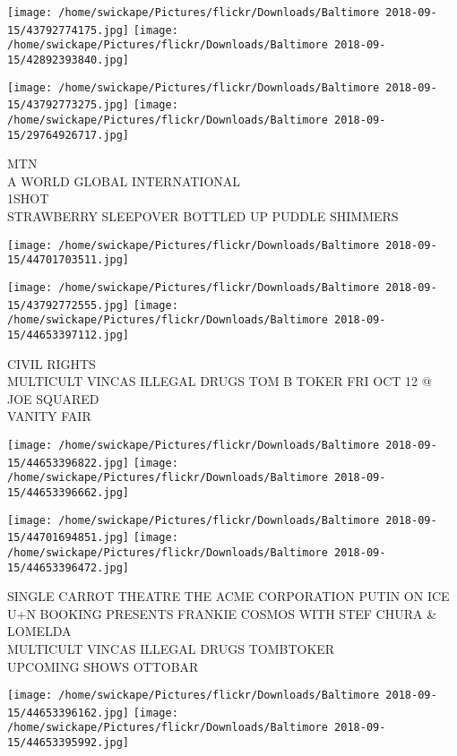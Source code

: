 \documentclass[10pt,letterpaper]{article}
\begin{document}
\texttt{[image: /home/swickape/Pictures/flickr/Downloads/Baltimore 2018-09-15/43792774175.jpg]}
\texttt{[image: /home/swickape/Pictures/flickr/Downloads/Baltimore 2018-09-15/42892393840.jpg]}

\texttt{[image: /home/swickape/Pictures/flickr/Downloads/Baltimore 2018-09-15/43792773275.jpg]}
\texttt{[image: /home/swickape/Pictures/flickr/Downloads/Baltimore 2018-09-15/29764926717.jpg]}

MTN\\
A WORLD GLOBAL INTERNATIONAL\\
1SHOT\\
STRAWBERRY SLEEPOVER BOTTLED UP PUDDLE SHIMMERS
\pagebreak

\texttt{[image: /home/swickape/Pictures/flickr/Downloads/Baltimore 2018-09-15/44701703511.jpg]}

\vspace{0.25in}
\texttt{[image: /home/swickape/Pictures/flickr/Downloads/Baltimore 2018-09-15/43792772555.jpg]}
\texttt{[image: /home/swickape/Pictures/flickr/Downloads/Baltimore 2018-09-15/44653397112.jpg]}

CIVIL RIGHTS\\
MULTICULT VINCAS ILLEGAL DRUGS TOM B TOKER FRI OCT 12 @ JOE SQUARED\\
VANITY FAIR
\pagebreak

\texttt{[image: /home/swickape/Pictures/flickr/Downloads/Baltimore 2018-09-15/44653396822.jpg]}
\texttt{[image: /home/swickape/Pictures/flickr/Downloads/Baltimore 2018-09-15/44653396662.jpg]}

\texttt{[image: /home/swickape/Pictures/flickr/Downloads/Baltimore 2018-09-15/44701694851.jpg]}
\texttt{[image: /home/swickape/Pictures/flickr/Downloads/Baltimore 2018-09-15/44653396472.jpg]}

SINGLE CARROT THEATRE THE ACME CORPORATION PUTIN ON ICE\\
U+N BOOKING PRESENTS FRANKIE COSMOS WITH STEF CHURA \& LOMELDA\\
MULTICULT VINCAS ILLEGAL DRUGS TOMBTOKER\\
UPCOMING SHOWS OTTOBAR
\pagebreak

\texttt{[image: /home/swickape/Pictures/flickr/Downloads/Baltimore 2018-09-15/44653396162.jpg]}
\texttt{[image: /home/swickape/Pictures/flickr/Downloads/Baltimore 2018-09-15/44653395992.jpg]}
\end{document}
